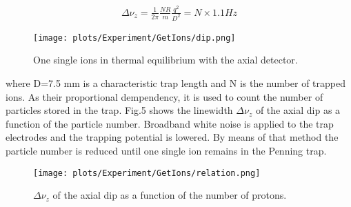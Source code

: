 \begin{align*}
\Delta\nu_z = \frac{1}{2\pi}\frac{NR}{m}\frac{q^2}{D^2} = N \times 1.1 Hz
\end{align*}

\begin{figure}[]
\begin{center}
\texttt{[image: plots/Experiment/GetIons/dip.png]}
\end{center}
\caption{One single ions in thermal equilibrium with the axial detector.}
\label{fig:particle dip}
\end{figure}


where D=7.5 mm is a characteristic trap length and N is the number of trapped ions\cite{doi:10.1063/1.321602}. As their proportional dempendency, it is used to count the number of particles stored in the trap. Fig.5 shows the linewidth $\Delta\nu_z$ of the axial dip as a function of the particle number. Broadband white noise is applied to the trap electrodes and the trapping potential is lowered. By means of that method the particle number is reduced until one single ion remains in the Penning trap.

\begin{figure}[]
\begin{center}
\texttt{[image: plots/Experiment/GetIons/relation.png]}
\end{center}
\caption{$\Delta\nu_z$ of the axial dip as a function of the number of protons.}
\label{fig:relation}
\end{figure}
